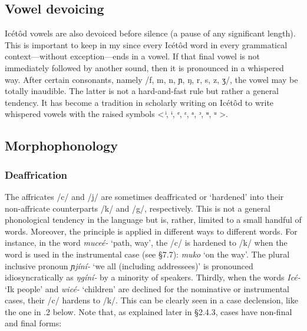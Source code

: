\subsection{Vowel devoicing}


Icétôd vowels are also devoiced before silence (a pause of any significant length). This is important to keep in my since every Icétôd word in every grammatical context—without exception—ends in a vowel. If that final vowel is not immediately followed by another sound, then it is pronounced in a whispered way. After certain consonants, namely /f, m, n, ɲ, ŋ, r, s, z, ʒ/, the vowel may be totally inaudible. The latter is not a hard-and-fast rule but rather a general tendency. It has become a tradition in scholarly writing on Icétôd to write whispered vowels with the raised symbols < ͥ, ᶤ, ᵉ, ᵋ, ᵃ, ᵓ, ᶶ, ᵘ >.
 
\subsection{Morphophonology}
\subsubsection{Deaffrication}

The affricates\textsc{ }/c/ and /j/ are sometimes deaffricated or ‘hardened’ into their non-affricate counterparts /k/ and /g/, respectively. This is not a general phonological tendency in the language but is, rather, limited to a small handful of words. Moreover, the principle is applied in different ways to different words. For instance, in the word \textit{muceé- }‘path, way’, the /c/ is hardened to /k/ when the word is used in the instrumental case (see §7.7): \textit{muko }‘on the way’. The plural inclusive pronoun \textit{ɲjíní- }‘we all (including addressees)’ is pronounced idiosyncratically as \textit{ŋgíní- }by a minority of speakers. Thirdly, when the words \textit{Icé- }‘Ik people’ and \textit{wicé- }‘children’ are declined for the nominative or instrumental cases, their /c/ hardens to /k/. This can be clearly seen in a case declension, like the one in .2 below. Note that, as explained later in §2.4.3, cases have non-final and final forms:



